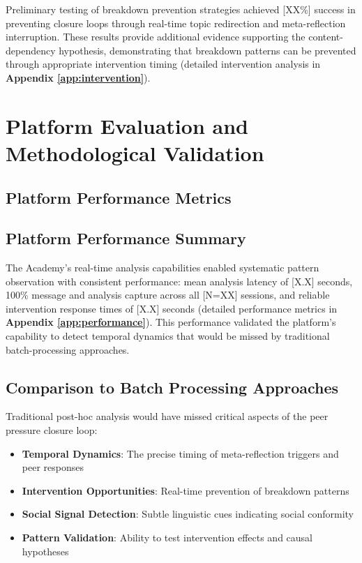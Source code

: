 \documentclass[11pt,letterpaper]{article}
\newcommand{\theacademy}{The Academy}
\newcommand{\totalSessions}{[N=XX]} %
\newcommand{\interventionSuccessRate}{[XX\%]} %
\begin{document}
Preliminary testing of breakdown prevention strategies achieved \interventionSuccessRate{} success in preventing closure loops through real-time topic redirection and meta-reflection interruption. These results provide additional evidence supporting the content-dependency hypothesis, demonstrating that breakdown patterns can be prevented through appropriate intervention timing (detailed intervention analysis in \textbf{Appendix \ref{app:intervention}}).

\section{Platform Evaluation and Methodological Validation}

\subsection{Platform Performance Metrics}

\subsection{Platform Performance Summary}

\theacademy{}'s real-time analysis capabilities enabled systematic pattern observation with consistent performance: mean analysis latency of [X.X] seconds, 100\% message and analysis capture across all \totalSessions{} sessions, and reliable intervention response times of [X.X] seconds (detailed performance metrics in \textbf{Appendix \ref{app:performance}}). This performance validated the platform's capability to detect temporal dynamics that would be missed by traditional batch-processing approaches.

\subsection{Comparison to Batch Processing Approaches}

Traditional post-hoc analysis would have missed critical aspects of the peer pressure closure loop:

\begin{itemize}
    \item \textbf{Temporal Dynamics}: The precise timing of meta-reflection triggers and peer responses
    \item \textbf{Intervention Opportunities}: Real-time prevention of breakdown patterns
    \item \textbf{Social Signal Detection}: Subtle linguistic cues indicating social conformity
    \item \textbf{Pattern Validation}: Ability to test intervention effects and causal hypotheses
\end{itemize}
\end{document}
